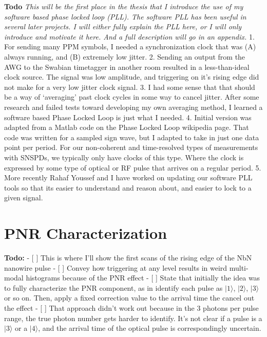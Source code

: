 \documentclass[12pt]{caltech_thesis}
\begin{document}
\textbf{Todo} \emph{This will be the first place in the thesis that I
introduce the use of my software based phase locked loop (PLL). The
software PLL has been useful in several later projects. I will either
fully explain the PLL here, or I will only introduce and motivate it
here. And a full description will go in an appendix. } 1. For sending
many PPM symbols, I needed a synchronization clock that was (A) always
running, and (B) extremely low jitter. 2. Sending an output from the AWG
to the Swabian timetagger in another room resulted in a less-than-ideal
clock source. The signal was low amplitude, and triggering on it's
rising edge did not make for a very low jitter clock signal. 3. I had
some sense that that should be a way of `averaging' past clock cycles in
some way to cancel jitter. After some research and failed tests toward
developing my own averaging method, I learned a software based Phase
Locked Loop is just what I needed. 4. Initial version was adapted from a
Matlab code on the Phase Locked Loop wikipedia page. That code was
written for a sampled sign wave, but I adapted to take in just one data
point per period. For our non-coherent and time-resolved types of
measurements with SNSPDs, we typically only have clocks of this type.
Where the clock is expressed by some type of optical or RF pulse that
arrives on a regular period. 5. More recently Rahaf Youssef and I have
worked on updating our software PLL tools so that its easier to
understand and reason about, and easier to lock to a given signal.

\hypertarget{pnr-characterization}{%
\section{PNR Characterization}\label{pnr-characterization}}

\textbf{Todo:} - {[} {]} This is where I'll show the first scans of the
rising edge of the NbN nanowire pulse - {[} {]} Convey how triggering at
any level results in weird multi-modal histograms because of the PNR
effect - {[} {]} State that initially the idea was to fully characterize
the PNR component, as in identify each pulse as \(|1\rangle\),
\(|2\rangle\), \(|3\rangle\) or so on. Then, apply a fixed correction
value to the arrival time the cancel out the effect - {[} {]} That
approach didn't work out because in the 3 photons per pulse range, the
true photon number gets harder to identify. It's not clear if a pulse is
a \(|3\rangle\) or a \(|4\rangle\), and the arrival time of the optical
pulse is correspondingly uncertain.
\end{document}

